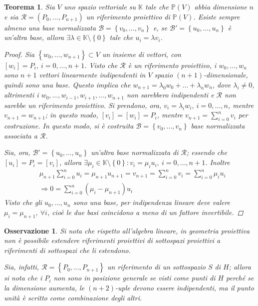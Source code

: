 \documentclass[11pt]{scrartcl}
\theoremstyle{style1}
\newtheorem{osservazione}{Osservazione}[section]
\newtheorem{teorema}{Teorema}[section]
\numberwithin{equation}{subsection}
\begin{document}
\begin{teorema}
	Sia $V$ uno spazio vettoriale su $\mathbb{K}$ tale che $\mathbb{P}(V)$ abbia dimensione $n$ e sia $\mathcal{R} =(P_0,\ldots,P_{n+1} )$ un riferimento proiettivo di $\mathbb{P}(V)$.
	Esiste sempre almeno una base normalizzata $\mathcal{B} = \left\{ v_0, \ldots,v_n\right\} $ e, se $\mathcal{B} ' = \left\{ u_0,\ldots,u_n \right\} $ \`e un'altra base, allora $\exists \lambda \in \mathbb{K}\setminus\left\{ 0 \right\} $ tale che $u_i = \lambda v_i$.
	\begin{proof}
		Sia $\left\{ w_0, \ldots,w_{n+1}  \right\} \subset V$ un insieme di vettori, con $[w_i] = P_i, \ i=0,\ldots,n+1$.
		Visto che $\mathcal{R}$ \`e un riferimento proiettivo, i $w_0,\ldots,w_n$ sono $n+1$ vettori linearmente indipendenti in $V$ spazio $(n+1)$-dimensionale, quindi sono una base.
		Questo implica che $w_{n+1} = \lambda _0 w_0 + \ldots + \lambda _n w_n$, dove $\lambda _i\neq 0$, altrimenti i $w_0,\ldots,w_{i-1} , w_{i+1} , \ldots, w_{n+1} $ non sarebbero indipendenti e $\mathcal{R} $ non sarebbe un riferimento proiettivo.
		Si prendono, ora, $v_i = \lambda _i w_i, \ i =0,\ldots,n$, mentre $v_{n+1} =w_{n+1} $; in questo modo, $[v_i]=[w_i] = P_i$, mentre $v_{n+1} = \sum_{i=0}^{n} v_i$ per costruzione.
		In questo modo, si \`e costruita $\mathcal{B} =\left\{ v_0,\ldots,v_n \right\} $ base normalizzata associata a $\mathcal{R} $.

		Sia, ora, $\mathcal{B} ' = \left\{ u_0,\ldots,u_n \right\} $ un'altra base normalizzata di $\mathcal{R} $; essendo che $[u_i] = P_i = [v_i]$, allora $\exists \mu _i \in \mathbb{K}\setminus\left\{ 0 \right\} : v_i = \mu _i u_i, \ i =0,\ldots,n+1$.
		Inoltre
		\[
			\begin{split}
				&\mu _{n+1} \sum_{i=0}^{n} u_i = \mu _{n+1} u_{n+1} = v_{n+1} = \sum_{i=0}^{n} v_i = \sum_{i=0}^{n} \mu _i u_i\\
				&\Rightarrow 0 = \sum_{i=0}^{n} (\mu _i-\mu _{n+1} ) u_i
			\end{split}
		\] 
	Visto che gli $u_0,\ldots,u_n$ sono una base, per indipendenza lineare deve valere $\mu _i = \mu _{n+1} , \ \forall i$, cio\`e le due basi coincidono a meno di un fattore invertibile.
	\end{proof}
\end{teorema}
\begin{osservazione}
Si nota che rispetto all'algebra lineare, in geometria proiettiva non \`e possibile estendere riferimenti proiettivi di sottospazi proiettivi a riferimenti di sottospazi che li estendono.

Sia, infatti, $\mathcal{R} = \left\{ P_0,\ldots,P_{n+1}  \right\}  $ un riferimento di un sottospazio $S $ di $H$; allora si nota che i $P_i$ non sono in posizione generale se visti come punti di $H$ perch\'e se la dimensione aumenta, le $(n+2)$-uple devono essere indipendenti, ma il punto unit\`a \`e scritto come combinazione degli altri.
\end{osservazione}
\end{document}
